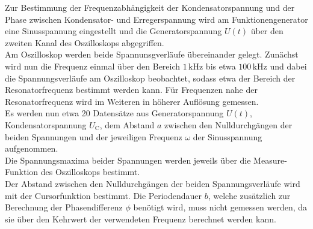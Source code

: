 Zur Bestimmung der Frequenzabhängigkeit der Kondensatorspannung und der Phase zwischen Kondensator- und Erregerspannung wird am Funktionengenerator eine Sinusspannung eingestellt und die Generatorspannung $U(t)$ über den zweiten Kanal des Oszilloskops abgegriffen.\\
Am Oszilloskop werden beide Spannunsgverläufe übereinander gelegt.
Zunächst wird nun die Frequenz einmal über den Bereich $1 \,\si{\kilo\Hz}$ bis etwa $100 \,\si{\kilo\Hz}$ und dabei die Spannungsverläufe am Oszilloskop beobachtet, sodass etwa der Bereich der Resonatorfrequenz bestimmt werden kann.
Für Frequenzen nahe der Resonatorfrequenz wird im Weiteren in höherer Auflösung gemessen.\\
Es werden nun etwa 20 Datensätze aus Generatorspannung $U(t)$, Kondensatorspannung $U_\text{C}$, dem Abstand $a$ zwischen den Nulldurchgängen der beiden Spannungen und der jeweiligen Frequenz $\omega$ der Sinusspannung aufgenommen.\\
Die Spannungsmaxima beider Spannungen werden jeweils über die Measure-Funktion des Oszilloskops bestimmt.\\
Der Abstand zwischen den Nulldurchgängen der beiden Spannungsverläufe wird mit der Cursorfunktion bestimmt.
Die Periodendauer $b$, welche zusätzlich zur Berechnung der Phasendifferenz $\phi$ benötigt wird, muss nicht gemessen werden, da sie über den Kehrwert der verwendeten Frequenz berechnet werden kann.
